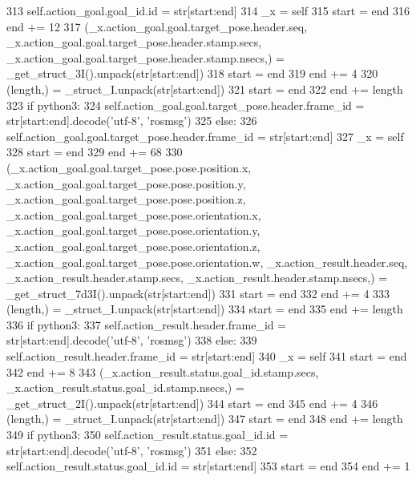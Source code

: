 \begin{DoxyCode}
313         self.action\_goal.goal\_id.id = str[start:end]
314       \_x = self
315       start = end
316       end += 12
317       (\_x.action\_goal.goal.target\_pose.header.seq, \_x.action\_goal.goal.target\_pose.header.stamp.secs, 
      \_x.action\_goal.goal.target\_pose.header.stamp.nsecs,) = \_get\_struct\_3I().unpack(str[start:end])
318       start = end
319       end += 4
320       (length,) = \_struct\_I.unpack(str[start:end])
321       start = end
322       end += length
323       \textcolor{keywordflow}{if} python3:
324         self.action\_goal.goal.target\_pose.header.frame\_id = str[start:end].decode(\textcolor{stringliteral}{'utf-8'}, \textcolor{stringliteral}{'rosmsg'})
325       \textcolor{keywordflow}{else}:
326         self.action\_goal.goal.target\_pose.header.frame\_id = str[start:end]
327       \_x = self
328       start = end
329       end += 68
330       (\_x.action\_goal.goal.target\_pose.pose.position.x, \_x.action\_goal.goal.target\_pose.pose.position.y, 
      \_x.action\_goal.goal.target\_pose.pose.position.z, \_x.action\_goal.goal.target\_pose.pose.orientation.x, 
      \_x.action\_goal.goal.target\_pose.pose.orientation.y, \_x.action\_goal.goal.target\_pose.pose.orientation.z, 
      \_x.action\_goal.goal.target\_pose.pose.orientation.w, \_x.action\_result.header.seq, \_x.action\_result.header.stamp.secs, 
      \_x.action\_result.header.stamp.nsecs,) = \_get\_struct\_7d3I().unpack(str[start:end])
331       start = end
332       end += 4
333       (length,) = \_struct\_I.unpack(str[start:end])
334       start = end
335       end += length
336       \textcolor{keywordflow}{if} python3:
337         self.action\_result.header.frame\_id = str[start:end].decode(\textcolor{stringliteral}{'utf-8'}, \textcolor{stringliteral}{'rosmsg'})
338       \textcolor{keywordflow}{else}:
339         self.action\_result.header.frame\_id = str[start:end]
340       \_x = self
341       start = end
342       end += 8
343       (\_x.action\_result.status.goal\_id.stamp.secs, \_x.action\_result.status.goal\_id.stamp.nsecs,) = 
      \_get\_struct\_2I().unpack(str[start:end])
344       start = end
345       end += 4
346       (length,) = \_struct\_I.unpack(str[start:end])
347       start = end
348       end += length
349       \textcolor{keywordflow}{if} python3:
350         self.action\_result.status.goal\_id.id = str[start:end].decode(\textcolor{stringliteral}{'utf-8'}, \textcolor{stringliteral}{'rosmsg'})
351       \textcolor{keywordflow}{else}:
352         self.action\_result.status.goal\_id.id = str[start:end]
353       start = end
354       end += 1

\end{DoxyCode}
